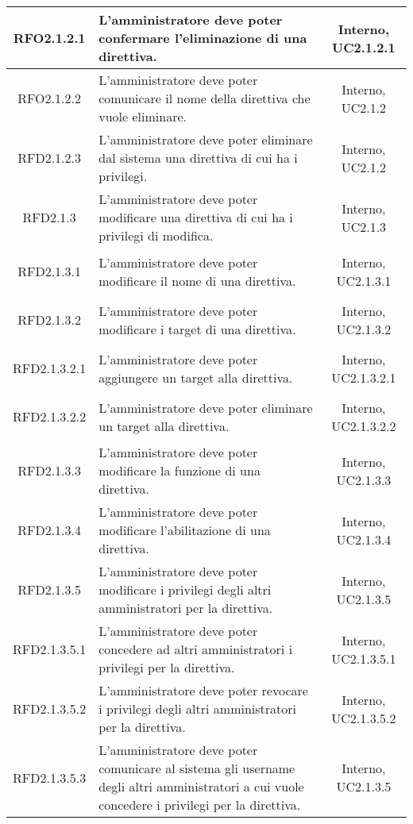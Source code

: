 \begin{longtable}{|c|>{\centering}m{7cm}|c|}
\hypertarget{RFO2.1.2.1}{RFO2.1.2.1} & L'amministratore deve poter confermare l'eliminazione di una direttiva. & Interno, UC2.1.2.1\\ \hline
\hypertarget{RFO2.1.2.2}{RFO2.1.2.2} & L'amministratore deve poter comunicare il nome della direttiva che vuole eliminare. & Interno, UC2.1.2\\ \hline
\hypertarget{RFD2.1.2.3}{RFD2.1.2.3} & L'amministratore deve poter eliminare dal sistema una direttiva di cui ha i privilegi. & Interno, UC2.1.2\\ \hline
\hypertarget{RFD2.1.3}{RFD2.1.3} & L'amministratore deve poter modificare una direttiva di cui ha i privilegi di modifica. & Interno, UC2.1.3\\ \hline
\hypertarget{RFD2.1.3.1}{RFD2.1.3.1} & L'amministratore deve poter modificare il nome di una direttiva. & Interno, UC2.1.3.1\\ \hline
\hypertarget{RFD2.1.3.2}{RFD2.1.3.2} & L'amministratore deve poter modificare i target di una direttiva. & Interno, UC2.1.3.2\\ \hline
\hypertarget{RFD2.1.3.2.1}{RFD2.1.3.2.1} & L'amministratore deve poter aggiungere un target alla direttiva. & Interno, UC2.1.3.2.1\\ \hline
\hypertarget{RFD2.1.3.2.2}{RFD2.1.3.2.2} & L'amministratore deve poter eliminare un target alla direttiva. & Interno, UC2.1.3.2.2\\ \hline
\hypertarget{RFD2.1.3.3}{RFD2.1.3.3} & L'amministratore deve poter modificare la funzione di una direttiva. & Interno, UC2.1.3.3\\ \hline
\hypertarget{RFD2.1.3.4}{RFD2.1.3.4} & L'amministratore deve poter modificare l'abilitazione di una direttiva. & Interno, UC2.1.3.4\\ \hline
\hypertarget{RFD2.1.3.5}{RFD2.1.3.5} & L'amministratore deve poter modificare i privilegi degli altri amministratori per la direttiva. & Interno, UC2.1.3.5\\ \hline
\hypertarget{RFD2.1.3.5.1}{RFD2.1.3.5.1} & L'amministratore deve poter concedere ad altri amministratori i privilegi per la direttiva. & Interno, UC2.1.3.5.1\\ \hline
\hypertarget{RFD2.1.3.5.2}{RFD2.1.3.5.2} & L'amministratore deve poter revocare i privilegi degli altri amministratori per la direttiva. & Interno, UC2.1.3.5.2\\ \hline
\hypertarget{RFD2.1.3.5.3}{RFD2.1.3.5.3} & L'amministratore deve poter comunicare al sistema gli username degli altri amministratori a cui vuole concedere i privilegi per la direttiva. & Interno, UC2.1.3.5\\ \hline

\end{longtable}
